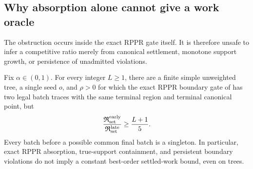 \subsection{Why absorption alone cannot give a work oracle}

The obstruction occurs inside the exact RPPR gate itself.  It is therefore
unsafe to infer a competitive ratio merely from canonical settlement,
monotone support growth, or persistence of unadmitted violations.

\begin{theorem}
\label{prop:batch-order-obstruction}
Fix $\alpha\in(0,1)$.  For every integer $L\geq1$, there are a finite simple
unweighted tree, a single seed $o$, and $\rho>0$ for which the exact RPPR
boundary gate of  has two legal batch traces
with the same terminal region and terminal canonical point, but
\begin{equation}
 \frac{\mathfrak R_{\rm set}^{\rm early}}
      {\mathfrak R_{\rm set}^{\rm late}}
 \geq \frac{L+1}{5}.
 \label{eq:rppr-heavy-early-ratio}
\end{equation}
Every batch before a possible common final batch is a singleton.  In
particular, exact RPPR absorption, true-support containment, and persistent
boundary violations do not imply a constant best-order settled-work bound,
even on trees.
\end{theorem}

